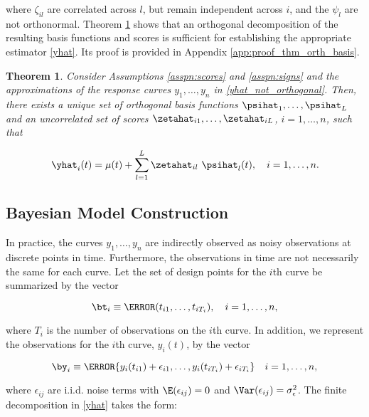 \documentclass[12pt]{article}
\def\sigsqeps{\sigma^2_{\epsilon}}
\theoremstyle{plain}
\newtheorem{theorem}{Theorem}[section]
\theoremstyle{definition}
\theoremstyle{remark}
\begin{document}
\noindent where $\zeta_{il}$ are correlated across $l$, but remain independent across $i$, and the $\psi_l$ are not
orthonormal. Theorem \ref{thm:orth_basis} shows that an orthogonal decomposition of the resulting basis functions
and scores is sufficient for establishing the appropriate estimator \eqref{yhat}.
Its proof is provided in Appendix \ref{app:proof_thm_orth_basis}.

\begin{theorem}
	
	Consider Assumptions \ref{asspn:scores} and \ref{asspn:signs} and the approximations of the response
	curves $y_1, \dots, y_n$ in \eqref{yhat_not_orthogonal}. Then, there exists a unique set of orthogonal basis
	functions $\psihat_1, \dots, \psihat_L$ and an uncorrelated set of scores $\zetahat_{i1}, \dots, \zetahat_{iL}$,
	$i = 1, \dots, n$, such that
	
	\[
		\yhat_i (t) = \mu (t) + \sum_{l=1}^L \zetahat_{il} \ \psihat_l (t), \quad i = 1, \dots, n.
	\]
	
\label{thm:orth_basis}
\end{theorem}


\subsection{Bayesian Model Construction}
\label{sec:bayes_mod}

In practice, the curves $y_1, \dots, y_n$ are indirectly observed as noisy observations at discrete points in time.
Furthermore, the observations in time are not necessarily the same for each curve.
Let the set of design points for the $i$th curve be summarized by the vector

\begin{equation}
	\bt_i \equiv \T{(t_{i1}, \dots, t_{iT_i})}, \quad i = 1, \dots, n,
\label{t_i}
\end{equation}

\noindent where $T_i$ is the number of observations on the $i$th curve. In addition, we represent the
observations for the $i$th curve, $y_i (t)$, by the vector

\begin{equation}
	\by_i \equiv \T{\{ y_i (t_{i1}) + \epsilon_{i1}, \dots, y_i (t_{iT_i}) + \epsilon_{iT_i} \}} \quad i = 1, \dots, n,
\label{disc_obs}
\end{equation}

\noindent where $\epsilon_{ij}$ are i.i.d. noise terms with $\E (\epsilon_{ij}) = 0$ and $\Var (\epsilon_{ij}) = \sigsqeps$.
The finite decomposition in \eqref{yhat} takes the form:
\end{document}
